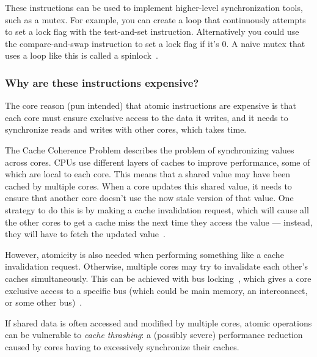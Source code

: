 These instructions can be used to implement higher-level synchronization tools, such as a mutex. For example, you can create a loop that continuously attempts to set a lock flag with the test-and-set instruction. Alternatively you could use the compare-and-swap instruction to set a lock flag if it's 0. A naive mutex that uses a loop like this is called a spinlock~\cite[slide 64]{concurrencyslides}.

\subsubsection{Why are these instructions expensive?}

The core reason (pun intended) that atomic instructions are expensive is that each core must ensure exclusive access to the data it writes, and it needs to synchronize reads and writes with other cores, which takes time.

The Cache Coherence Problem describes the problem of synchronizing values across cores. CPUs use different layers of caches to improve performance, some of which are local to each core. This means that a shared value may have been cached by multiple cores. When a core updates this shared value, it needs to ensure that another core doesn't use the now stale version of that value. One strategy to do this is by making a cache invalidation request, which will cause all the other cores to get a cache miss the next time they access the value --- instead, they will have to fetch the updated value~\cite[slide 44-54]{concurrencyslides}.

However, atomicity is also needed when performing something like a cache invalidation request. Otherwise, multiple cores may try to invalidate each other's caches simultaneously. This can be achieved with bus locking~\cite[slide 55]{concurrencyslides}, which gives a core exclusive access to a specific bus (which could be main memory, an interconnect, or some other bus)~\cite[slide 55]{concurrencyslides}.

If shared data is often accessed and modified by multiple cores, atomic operations can be vulnerable to \textit{cache thrashing}: a (possibly severe) performance reduction caused by cores having to excessively synchronize their caches.
